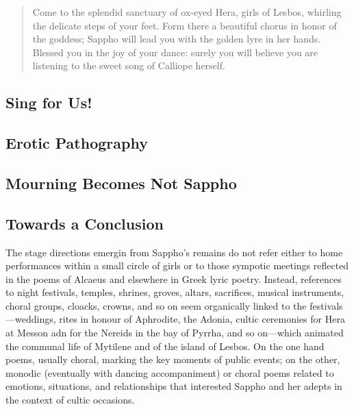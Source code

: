 \begin{quotation}
    Come to the splendid sanctuary of ox-eyed Hera, girls of Lesbos, whirling the delicate steps of your feet. Form there a beautiful chorus in honor of the goddess; Sappho will lead you with the golden lyre in her hands. Blessed you in the joy of your dance: surely you will believe you are listening to the sweet song of Calliope herself.
\end{quotation}



\subsection{Sing for Us!}



\subsection{Erotic Pathography}


\subsection{Mourning Becomes Not Sappho}



\subsection{Towards a Conclusion}

The stage directions emergin from Sappho's remains do not refer either to home performances within a small circle of girls or to those sympotic meetings reflected in the poems of Alcaeus and elsewhere in Greek lyric poetry. Instead, references to night festivals, temples, shrines, groves, altars, sacrifices, musical instruments, choral groups, cloacks, crowns, and so on seem organically linked to the festivals---weddings, rites in honour of Aphrodite, the Adonia, cultic ceremonies for Hera at Messon adn for the Nereids in the bay of Pyrrha, and so on---which animated the communal life of Mytilene and of the island of Lesbos. On the one hand poems, usually choral, marking the key moments of public events; on the other, monodic (eventually with dancing accompaniment) or choral poems related to emotions, situations, and relationships that interested Sappho and her adepts in the context of cultic occasions.



%
%
%


